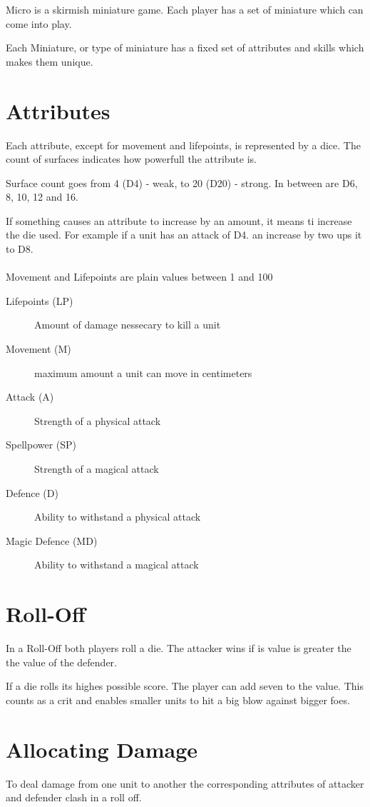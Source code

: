 \documentclass[a5paper,pagesize,10pt,bibtotoc,pointlessnumbers,
normalheadings,DIV=9,twoside=false]{scrbook}
\begin{document}
Micro is a skirmish miniature game. Each player has a set of miniature which can come into play.

Each Miniature, or type of miniature has a fixed set of attributes and skills which makes them unique.

\section{Attributes}
Each attribute, except for movement and lifepoints, is represented by a dice. The count of surfaces indicates how powerfull the attribute is.

Surface count goes from 4 (D4) - weak, to 20 (D20) - strong. In between are D6, 8, 10, 12 and 16.

If something causes an attribute to increase by an amount, it means ti increase the die used. For example if a unit has an attack of D4. an increase by two ups it to D8.\\
\\
Movement and Lifepoints are plain values between 1 and 100

\begin{description}
\item[Lifepoints (LP)]
Amount of damage nessecary to kill a unit
\item[Movement (M)]
maximum amount a unit can move in centimeters
\item[Attack (A)]
Strength of a physical attack
\item[Spellpower (SP)]
Strength of a magical attack
\item[Defence (D)]
Ability to withstand a physical attack
\item[Magic Defence (MD)]
Ability to withstand a magical attack
\end{description}

\section{Roll-Off}
In a Roll-Off both players roll a die. The attacker wins if is value is greater the the value of the defender.

If a die rolls its highes possible score. The player can add seven to the value. This counts as a crit and enables smaller units to hit a big blow against bigger foes.

\section{Allocating Damage}
To deal damage from one unit to another the corresponding attributes of attacker and defender clash in a roll off.
\end{document}
